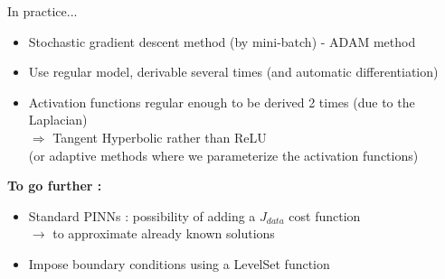 \begin{frame}{In practice...}
	\begin{itemize}[]		
		\item Stochastic gradient descent method (by mini-batch) - ADAM method 		
		\item Use regular model, derivable several times (and automatic differentiation)
		\item Activation functions regular enough to be derived 2 times (due to the Laplacian) \\
		$\Rightarrow$ Tangent Hyperbolic rather than ReLU \\
		(or adaptive methods where we parameterize the activation functions)
		
		\begin{center}
			\begin{minipage}{0.43\linewidth}
				\raggedleft
			\end{minipage} \hfill
			\begin{minipage}{0.1\linewidth}
				\centering
			\end{minipage} \hfill
			\begin{minipage}{0.43\linewidth}
				\raggedright
			\end{minipage}
		\end{center}
	
		
	\end{itemize}

	\textbf{To go further :}
	\begin{itemize}[]				
		\item Standard PINNs : possibility of adding a $J_{data}$ cost function \\
		$\rightarrow$ to approximate already known solutions
		
		\item Impose boundary conditions using a LevelSet function
	\end{itemize}

	
\end{frame}

